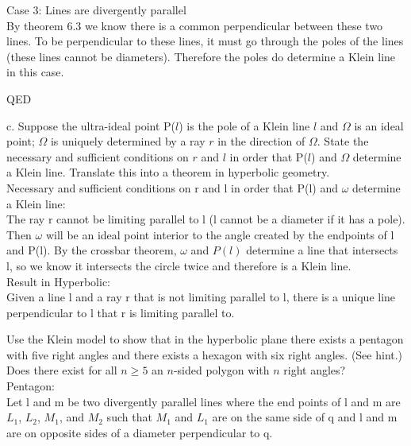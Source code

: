 \documentclass[12pt,letterpaper]{article}
\newcommand{\QED}{\begin{flushright}QED\end{flushright}}
\newcommand{\prob}[1]{\newpage\noindent {\bf #1}}
\begin{document}
Case 3: Lines are divergently parallel\\

By theorem 6.3 we know there is a common perpendicular between these two lines.  To be perpendicular to these lines, it must go through the poles of the lines (these lines cannot be diameters).  Therefore the poles do determine a Klein line in this case.

\QED


\newpage

c.  Suppose the ultra-ideal point P($l$) is the pole of a Klein line $l$ and $\Omega$ is an ideal point; $\Omega$ is uniquely determined by a ray $r$ in the direction of $\Omega$. State the necessary and sufficient conditions on $r$ and $l$ in order that P($l$) and $\Omega$ determine a Klein line. Translate this into a theorem in hyperbolic geometry. \\

Necessary and sufficient conditions on r and l in order that P(l) and $\omega$ determine a Klein line: \\

The ray r cannot be limiting parallel to l (l cannot be a diameter if it has a pole).  Then $\omega$ will be an ideal point interior to the angle created by the endpoints of l and P(l).  By the crossbar theorem, $\omega$ and $P(l)$ determine a line that intersects l, so we know it intersects the circle twice and therefore is a Klein line.\\

Result in Hyperbolic: \\

Given a line l and a ray r that is not limiting parallel to l, there is a unique line perpendicular to l that r is limiting parallel to.  



\prob{Chapter 7: K5 } Use the Klein model to show that in the hyperbolic plane there exists a pentagon with five right angles and there exists a hexagon with six right angles. (See hint.) Does there exist for all $n\geq 5$ an $n$-sided polygon with $n$ right angles?\\

\noindent Pentagon:\\


Let l and m be two divergently parallel lines where the end points of l and m are $L_1$, $L_2$, $M_1$, and $M_2$ such that $M_1$ and $L_1$ are on the same side of q and l and m are on opposite sides of a diameter perpendicular to q. 
\end{document}
